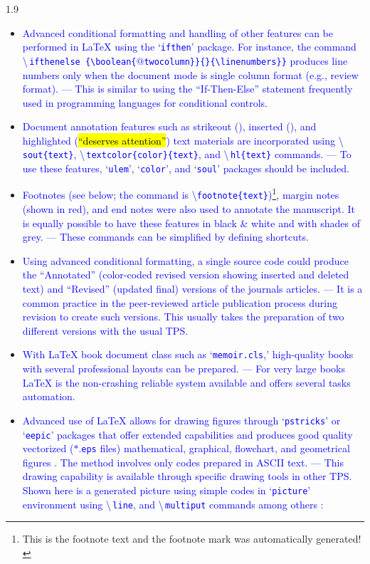 \documentclass[phd]{ndsu-thesis-2022}
\newcommand\myspacing{1.9}      %
\newcommand\italk[1]{\textcolor{blue}{#1}}  %
\newcommand\cmd[1]{\textbackslash\texttt{#1}}  %
\newcommand\lx{\LaTeX\xspace}
\newcommand\vb[1]{\textcolor{blue}{\texttt{#1}}}%
\newcommand\vbc[1]{\textcolor{blue}{\textbackslash\,\texttt{#1}}}%
\begin{document}
\begin{spacing}{\myspacing}
\begin{itemize}[leftmargin=*, itemsep=0pt, parsep=3pt]
\item \italk{Advanced conditional formatting and handling of other features can be performed in \lx using the `\vb{ifthen}' package. For instance, the command} \vbc{ifthenelse
\{\textbackslash boolean\{$@$twocolumn\}\}\{\}\{\textbackslash linenumbers\}\}} \italk{produces line numbers only when the document mode is single column format (e.g., review format). --- This is similar to using the ``If-Then-Else'' statement frequently used in programming languages for conditional controls.}   

\item \italk{Document annotation features such as strikeout (\dt{``deleted text''}), inserted (\nt{``newly added''}), and highlighted (\hl{``deserves attention''}) text materials are incorporated using \vbc{sout\{text\}}, \vbc{textcolor\{color\}\{text\}}, and \vbc{hl\{text\}} commands. --- To use these features, `\vb{ulem}', `\vb{color}', and `\vb{soul}' packages should be included.} 

\item \italk{Footnotes (see below; the command is \cmd{footnote\{text\}})\footnote{This is the footnote text and the footnote mark was automatically generated!}, margin notes {\marginpar{\scriptsize\textcolor{red}{This is margin note shown in color.}}} (shown in red), and end notes were also used to annotate the manuscript. It is equally possible to have these features in black \& white and with shades of grey. --- These commands can be simplified by defining shortcuts.} 

\item \italk{Using advanced conditional formatting, a single source code could produce the ``Annotated'' (color-coded revised version showing inserted and deleted text) and ``Revised'' (updated final) versions of the journals articles. --- It is a common practice in the peer-reviewed article publication process during revision to create such versions. This usually takes the preparation of two different versions with the usual TPS.}  

\item \italk{With \lx book document class such as `\vb{memoir.cls},' high-quality books with several professional layouts can be prepared. --- For very large books \lx is the non-crashing reliable system available and offers several tasks automation.}   

\item \italk{Advanced use of \lx allows for drawing figures through `\vb{pstricks}' or `\vb{eepic}' packages that offer extended capabilities and produces good quality vectorized ($\ast$.\vb{eps} files) mathematical, graphical, flowchart, and geometrical figures \citep{Goossens2008g}. The method involves only codes prepared in ASCII text. --- This drawing capability is available through specific drawing tools in other TPS. Shown here is a generated picture using simple codes in `\vb{picture}' environment using \vbc{line}, and \vbc{multiput} commands among others \citep{Kern2007a, Kern2007, Mittelbach2004}:}   


\end{itemize}
\end{spacing}
\end{document}

